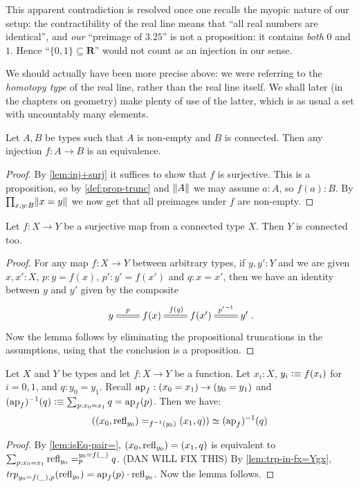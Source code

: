 \begin{definition}
\begin{remark}
  This apparent contradiction is resolved once one recalls the myopic nature of our setup: the contractibility of the real line means that ``all real numbers are identical'', and \emph{our} ``preimage of $3.25$'' is not a proposition: it contains \emph{both} $0$ and $1$.  Hence ``$\{0,1\}\subseteq\mathbf R$'' would not count as an injection in our sense.

  We should actually have been more precise above: we were referring to the \emph{homotopy type} of the real line, rather than the real line itself.
  We shall later (in the chapters on geometry) make plenty of use of the latter,
  which is as usual a set with uncountably many elements.
% 
\end{remark}

\begin{corollary}\label{cor:inj+connected}
Let $A,B$ be types such that $A$ is non-empty and $B$ is connected.
Then any injection $f: A\to B$ is an equivalence.
\end{corollary}
\begin{proof}
By \cref{lem:inj+surj} it suffices to show that $f$ is surjective.
This is a proposition, so by \cref{def:prop-trunc} and $\lVert A\rVert$
we may assume $a:A$, so $f(a):B$. By $\prod_{x,y:B} \lVert x=y\rVert$
we now get that all preimages under $f$ are non-empty.
\end{proof}

\begin{lemma}\label{lem:whenisbasespaceconnected}
Let $f:X\to Y$ be a surjective map from a connected type $X$. Then $Y$ is connected too.  
\end{lemma}
\begin{proof}
For any map $f:X\to Y$ between arbitrary types, if $y,y':Y$ and we are given 
$x,x':X$, $p:y=f(x)$, $p':y'=f(x')$ and $q:x=x'$, 
then we have an identity between $y$ and $y'$ given by the composite
$$\xymatrix{y\ar@{=}[r]^-p&f(x)\ar@{=}[r]^{f(q)}&f(x')\ar@{=}[r]^-{p'{}^{-1}}&y'}.$$
Now the lemma follows by eliminating the propositional truncations in the assumptions,
using that the conclusion is a proposition.
\end{proof}

\begin{lemma}\label{lem:fib-vs-path}
Let $X$ and $Y$ be types and let $f:X\to Y$ be a function.
Let $x_i:X$, $y_i\defeq f(x_i)$ for $i=0,1$, and $q:y_0 = y_1$.
Recall $\ap{f}: (x_0=x_1) \to (y_0 = y_1)$ and
$(\ap{f})^{-1}(q) \defeq \sum_{p:x_0=x_1} q =\ap{f}(p)$.
Then we have:
\[
((x_0,\refl{y_0})=_{f^{-1}(y_0)}(x_1,q))\equiv (\ap{f})^{-1}(q)
\]
\end{lemma}
\begin{proof}
By \cref{lem:isEq-pair=},
$(x_0,\refl{y_0})=(x_1,q)$ is equivalent to
$\sum_{p:x_0=x_1} \pathover {\refl{y_0}} {y_0=f(\_)} p q$.
(DAN WILL FIX THIS)
By \cref{lem:trp-in-fx=Ygx}, $\trp[y_0=f(\_)]{p}(\refl{y_0}) =
\ap{f}(p) \cdot \refl{y_0}$. Now the lemma follows.
\end{proof}


\end{definition}
